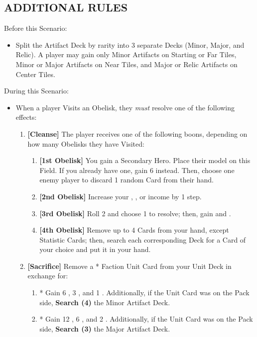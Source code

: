 \begin{multicols*}{2}
\subsection*{\MakeUppercase{Additional Rules}}
Before this Scenario:

\begin{itemize}
  \item Split the Artifact Deck by rarity into 3 separate Decks (Minor, Major, and Relic). A player may gain only Minor Artifacts on Starting or Far Tiles, Minor or Major Artifacts on Near Tiles, and Major or Relic Artifacts on Center Tiles.
\end{itemize}

During this Scenario:

\begin{itemize}
  \item When a player Visits an Obelisk, they \textit{must} resolve one of the following effects:
  \begin{enumerate}[leftmargin=15pt]
    \item \textbf{[Cleanse]} The player receives one of the following boons, depending on how many Obelisks they have Visited:
    \begin{enumerate}
      \item \textbf{[1st Obelisk]} You gain a Secondary Hero. Place their model on this Field. If you already have one, gain 6  instead. Then, choose one enemy player to discard 1 random Card from their hand.
      \item \textbf{[2nd Obelisk]} Increase your , , or  income by 1 step.
      \item \textbf{[3rd Obelisk]} Roll 2  and choose 1 to resolve; then, gain  and .
      \item \textbf{[4th Obelisk]} Remove up to 4 Cards from your hand, except Statistic Cards; then, search each corresponding Deck for a Card of your choice and put it in your hand.
    \end{enumerate}
    \item \textbf{[Sacrifice]} Remove a * Faction Unit Card from your Unit Deck in exchange for:
    \begin{enumerate}
      \item *\bronze\: Gain 6 , 3 , and 1 . Additionally, if the Unit Card was on the Pack side, \textbf{Search (4)} the Minor Artifact Deck.
      \item *\silver\: Gain 12 , 6 , and 2 . Additionally, if the Unit Card was on the Pack side, \textbf{Search (3)} the Major Artifact Deck.

\end{enumerate}
\end{enumerate}
\end{itemize}
\end{multicols*}
